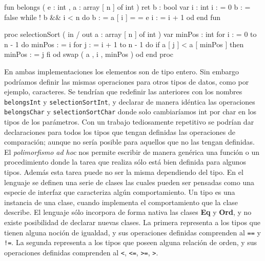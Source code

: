 \begin{pascallike}
fun belongs ( e : int , a : array [ n ] of int ) ret b : bool
var i : int
i : = 0
b : = false
    while ! b && i < n do
        b : = a [ i ] = = e
        i : = i + 1
    od
end fun    
\end{pascallike}

\begin{pascallike}
proc selectionSort ( in / out a : array [ n ] of int )
var minPos : int
    for i : = 0 to n - 1 do
        minPos : = i
        for j : = i + 1 to n - 1 do
            if a [ j ] < a [ minPos ] then minPos : = j fi
        od
        swap ( a , i , minPos )
    od
end proc
\end{pascallike}
En ambas implementaciones los elementos son de tipo entero. Sin embargo podríamos definir las mismas operaciones para otros tipos de datos, como por ejemplo, caracteres. Se tendrían que redefinir las anteriores con los nombres \texttt{belongsInt} y \texttt{selectionSortInt}, y declarar de manera idéntica las operaciones \texttt{belongsChar} y \texttt{selectionSortChar} donde solo cambiaríamos int por char en los tipos de los parámetros. Con un trabajo tediosamente repetitivo se podrían dar declaraciones para todos los tipos que tengan definidas las operaciones de comparación; aunque no sería posible para aquellos que no las tengan definidas. El \textit{polimorfismo ad hoc} nos permite escribir de manera genérica una función o un procedimiento donde la tarea que realiza sólo está bien definida para algunos tipos. Además esta tarea puede no ser la misma dependiendo del tipo.
\newline
En el lenguaje se definen una serie de clases las cuales pueden ser pensadas como una especie de interfaz que caracteriza algún comportamiento. Un tipo es una instancia de una clase, cuando implementa el comportamiento que la clase describe. El lenguaje sólo incorpora de forma nativa las clases \textbf{Eq} y \textbf{Ord}, y no existe posibilidad de declarar nuevas clases. La primera representa a los tipos que tienen alguna noción de igualdad, y sus operaciones definidas comprenden al \texttt{==} y \texttt{!=}. La segunda representa a los tipos que poseen alguna relación de orden, y sus operaciones definidas comprenden al \texttt{<}, \texttt{<=}, \texttt{>=}, \texttt{>}.


